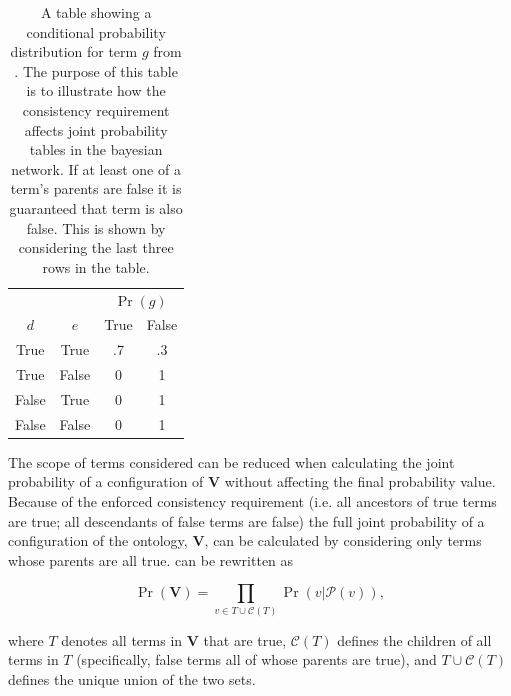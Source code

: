 

\begin{table}[t]
\caption[A table of the joint probability distribution for variable $g$]{A table showing a conditional probability distribution for term $g$ from .  The purpose of this table is to illustrate how the consistency requirement affects joint probability tables in the bayesian network.   If at least one of a term's parents are false it is guaranteed that term is also false.  This is shown by considering the last three rows in the table.  
}

{\begin{tabular}{cc|cc}
\hphantom & \multicolumn{1}{c}{\hphantom} & \multicolumn{2}{c}{$\Pr(g)$}\\
$d$ & $e$ & True & False\\
\hline
True & True & .7 & .3\\
True & False & 0 & 1\\
False & True & 0 & 1\\
False & False & 0 & 1\\

\end{tabular}}
\label{tab:rumiCPD}
\end{table}

The scope of terms considered can be reduced when calculating the joint probability of a configuration of $\mathbf{V}$ without affecting the final probability value. Because of the enforced consistency requirement (i.e. all ancestors of true terms are true; all descendants of false terms are false) the full joint probability of a configuration of the ontology, $\mathbf{V}$, can be calculated by considering only terms whose parents are all true.  can be rewritten as

\begin{equation}
\Pr(\mathbf{V})=\underset{v\in T \cup \mathcal{C}(T)}{\prod}\Pr(v|\mathcal{P}(v)),
\label{eq:full_joint}
\end{equation}

\noindent where $T$ denotes all terms in $\mathbf{V}$ that are true, $\mathcal{C}(T)$ defines the children of all terms in $T$ (specifically, false terms all of whose parents are true), and  $T \cup \mathcal{C}(T)$ defines the unique union of the two sets. 


